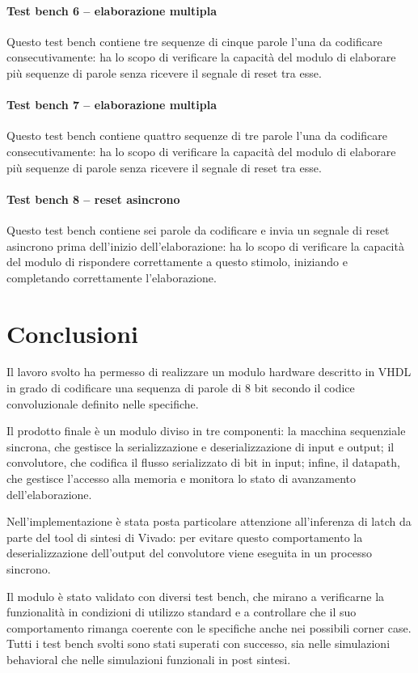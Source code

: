 \documentclass{article}
\begin{document}
				\paragraph{Test bench 6 -- elaborazione multipla}
					Questo test bench contiene tre sequenze di cinque parole l'una da codificare
					consecutivamente: ha lo scopo di verificare la capacità del modulo di elaborare
					più sequenze di parole senza ricevere il segnale di reset tra esse.
				\paragraph{Test bench 7 -- elaborazione multipla}
					Questo test bench contiene quattro sequenze di tre parole l'una da codificare
					consecutivamente: ha lo scopo di verificare la capacità del modulo di elaborare
					più sequenze di parole senza ricevere il segnale di reset tra esse.
				\paragraph{Test bench 8 -- reset asincrono}
					Questo test bench contiene sei parole da codificare e invia un segnale di reset
					asincrono prima dell'inizio dell'elaborazione: ha lo scopo di verificare la
					capacità del modulo di rispondere correttamente a questo stimolo, iniziando e
					completando correttamente l'elaborazione.

	\section{Conclusioni}
		Il lavoro svolto ha permesso di realizzare un modulo hardware descritto in VHDL in
		grado di codificare una sequenza di parole di 8 bit secondo il codice convoluzionale
		definito nelle specifiche.

		Il prodotto finale è un modulo diviso in tre componenti: la macchina sequenziale
		sincrona, che gestisce la serializzazione e deserializzazione di input e output; il
		convolutore, che codifica il flusso serializzato di bit in input; infine, il datapath,
		che gestisce l'accesso alla memoria e monitora lo stato di avanzamento
		dell'elaborazione.

		Nell'implementazione è stata posta particolare attenzione all'inferenza di latch da
		parte del tool di sintesi di Vivado: per evitare questo comportamento la
		deserializzazione dell'output del convolutore viene eseguita in un processo sincrono.

		Il modulo è stato validato con diversi test bench, che mirano a verificarne la
		funzionalità in condizioni di utilizzo standard e a controllare che il suo
		comportamento rimanga coerente con le specifiche anche nei possibili corner case.
		Tutti i test bench svolti sono stati superati con successo, sia nelle simulazioni
		behavioral che nelle simulazioni funzionali in post sintesi.
\end{document}
